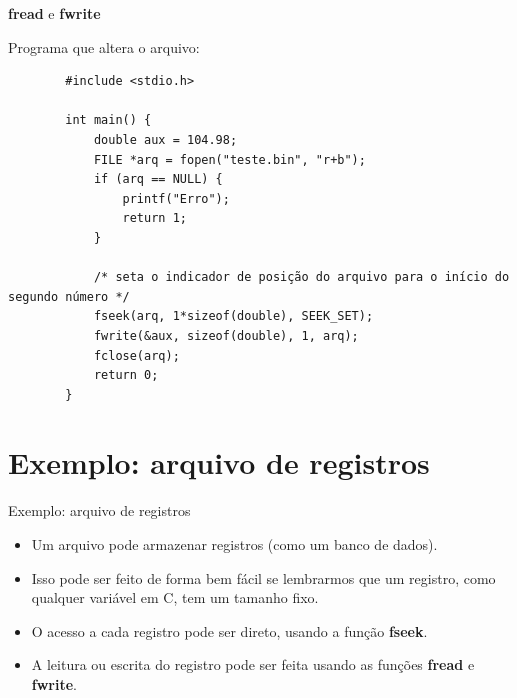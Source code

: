 \documentclass[handout]{beamer}
\begin{document}
\begin{frame}[fragile]{\textbf{fread} e \textbf{fwrite}}

    Programa que altera o  arquivo:
    \begin{verbatim}
        #include <stdio.h>

        int main() {
            double aux = 104.98;
            FILE *arq = fopen("teste.bin", "r+b");
            if (arq == NULL) {
                printf("Erro");
                return 1;
            }

            /* seta o indicador de posição do arquivo para o início do segundo número */
            fseek(arq, 1*sizeof(double), SEEK_SET);
            fwrite(&aux, sizeof(double), 1, arq);
            fclose(arq);
            return 0;
        }
    \end{verbatim}

\end{frame}

\section{Exemplo: arquivo de registros}

\begin{frame}{Exemplo: arquivo de registros}

    \begin{itemize}
        \item Um arquivo pode armazenar registros (como um banco de dados).
        \item Isso pode ser feito de forma bem fácil se lembrarmos que um
        registro, como qualquer variável em C, tem um tamanho fixo.
        \item O acesso a cada registro pode ser direto, usando a função
        \textbf{fseek}.
        \item A leitura ou escrita do registro pode ser feita usando as
        funções \textbf{fread} e \textbf{fwrite}.
    \end{itemize}

\end{frame}
\end{document}

